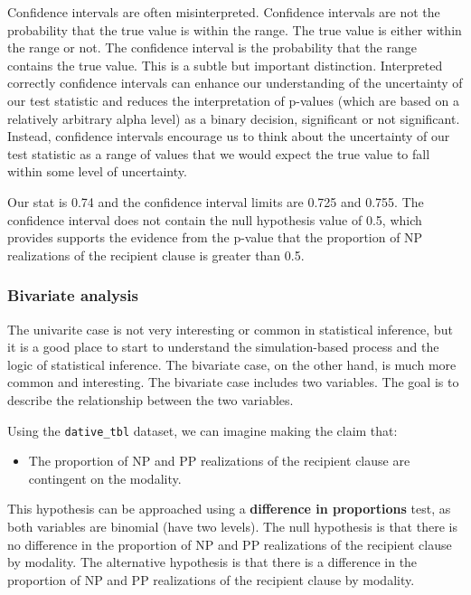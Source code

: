 \documentclass[
  letterpaper,
]{latex/krantz}
\providecommand{\tightlist}{%
  \setlength{\itemsep}{0pt}\setlength{\parskip}{0pt}}\usepackage{longtable,booktabs,array}
\theoremstyle{definition}
\theoremstyle{remark}
\begin{document}
Confidence intervals are often misinterpreted. Confidence intervals are
not the probability that the true value is within the range. The true
value is either within the range or not. The confidence interval is the
probability that the range contains the true value. This is a subtle but
important distinction. Interpreted correctly confidence intervals can
enhance our understanding of the uncertainty of our test statistic and
reduces the interpretation of p-values (which are based on a relatively
arbitrary alpha level) as a binary decision, significant or not
significant. Instead, confidence intervals encourage us to think about
the uncertainty of our test statistic as a range of values that we would
expect the true value to fall within some level of uncertainty.

Our stat is 0.74 and the confidence interval limits are 0.725 and 0.755.
The confidence interval does not contain the null hypothesis value of
0.5, which provides supports the evidence from the p-value that the
proportion of NP realizations of the recipient clause is greater than
0.5.

\subsubsection{Bivariate analysis}\label{sec-ida-cat-bivariate}

The univarite case is not very interesting or common in statistical
inference, but it is a good place to start to understand the
simulation-based process and the logic of statistical inference. The
bivariate case, on the other hand, is much more common and interesting.
The bivariate case includes two variables. The goal is to describe the
relationship between the two variables.

Using the \texttt{dative\_tbl} dataset, we can imagine making the claim
that:

\begin{itemize}
\tightlist
\item
  The proportion of NP and PP realizations of the recipient clause are
  contingent on the modality.
\end{itemize}

This hypothesis can be approached using a \textbf{difference in
proportions} test, as both variables are binomial (have two levels). The
null hypothesis is that there is no difference in the proportion of NP
and PP realizations of the recipient clause by modality. The alternative
hypothesis is that there is a difference in the proportion of NP and PP
realizations of the recipient clause by modality.
\end{document}
